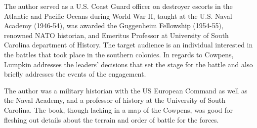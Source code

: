 The author served as a U.S. Coast Guard officer on destroyer escorts in the
Atlantic and Pacific Oceans during World War II, taught at the U.S. Naval
Academy (1946-54), was awarded the Guggenheim Fellowship (1954-55), renowned
NATO historian, and Emeritus Professor at University of South Carolina
department of History.  The target audience is an individual interested in the
battles that took place in the southern colonies.  In regards to Cowpens,
Lumpkin addresses the leaders’ decisions that set the stage for the battle and
also briefly addresses the events of the engagement. 

The author was a military historian with the US European Command as
well as the Naval Academy, and a professor of history at the University of
South Carolina.  The book, though lacking in a map of the Cowpens, was good for
fleshing out details about the terrain and order of battle for the forces.
